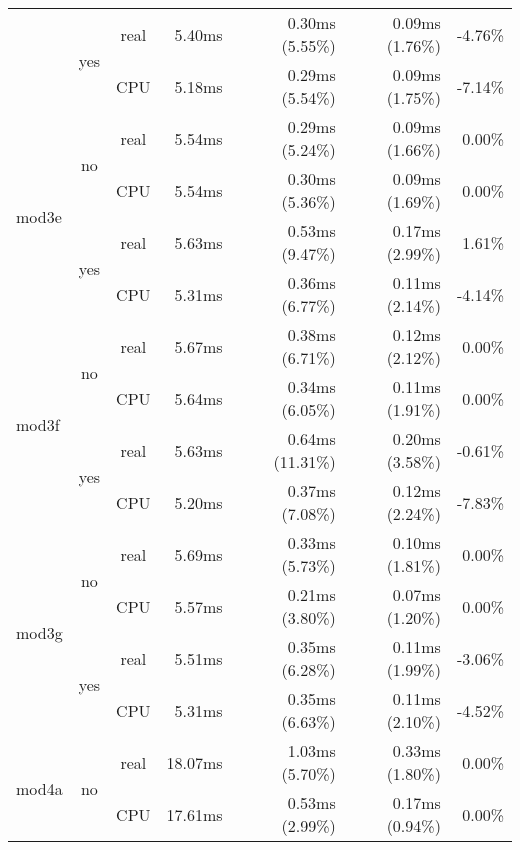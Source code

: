 \documentclass[en]{pracamgr}
\begin{document}
\begin{appendices}
\begin{small}
\begin{longtable}{|l|c|c|r|r|r|r|}
                          \cline{2-7}
                          & \multirow{2}{*}{yes} & real & 5.40ms & 0.30ms (5.55\%) & 0.09ms (1.76\%) & -4.76\% \\*
                          &                      & CPU  & 5.18ms & 0.29ms (5.54\%) & 0.09ms (1.75\%) & -7.14\% \\
\hline
\multirow{4}{*}{mod3e}    & \multirow{2}{*}{no}  & real & 5.54ms & 0.29ms (5.24\%) & 0.09ms (1.66\%) & 0.00\% \\*
                          &                      & CPU  & 5.54ms & 0.30ms (5.36\%) & 0.09ms (1.69\%) & 0.00\% \\*
                          \cline{2-7}
                          & \multirow{2}{*}{yes} & real & 5.63ms & 0.53ms (9.47\%) & 0.17ms (2.99\%) & 1.61\% \\*
                          &                      & CPU  & 5.31ms & 0.36ms (6.77\%) & 0.11ms (2.14\%) & -4.14\% \\
\hline
\multirow{4}{*}{mod3f}    & \multirow{2}{*}{no}  & real & 5.67ms & 0.38ms (6.71\%) & 0.12ms (2.12\%) & 0.00\% \\*
                          &                      & CPU  & 5.64ms & 0.34ms (6.05\%) & 0.11ms (1.91\%) & 0.00\% \\*
                          \cline{2-7}
                          & \multirow{2}{*}{yes} & real & 5.63ms & 0.64ms (11.31\%) & 0.20ms (3.58\%) & -0.61\% \\*
                          &                      & CPU  & 5.20ms & 0.37ms (7.08\%) & 0.12ms (2.24\%) & -7.83\% \\
\hline
\multirow{4}{*}{mod3g}    & \multirow{2}{*}{no}  & real & 5.69ms & 0.33ms (5.73\%) & 0.10ms (1.81\%) & 0.00\% \\*
                          &                      & CPU  & 5.57ms & 0.21ms (3.80\%) & 0.07ms (1.20\%) & 0.00\% \\*
                          \cline{2-7}
                          & \multirow{2}{*}{yes} & real & 5.51ms & 0.35ms (6.28\%) & 0.11ms (1.99\%) & -3.06\% \\*
                          &                      & CPU  & 5.31ms & 0.35ms (6.63\%) & 0.11ms (2.10\%) & -4.52\% \\
\hline
\multirow{4}{*}{mod4a}    & \multirow{2}{*}{no}  & real & 18.07ms & 1.03ms (5.70\%) & 0.33ms (1.80\%) & 0.00\% \\*
                          &                      & CPU  & 17.61ms & 0.53ms (2.99\%) & 0.17ms (0.94\%) & 0.00\% \\*

\end{longtable}
\end{small}
\end{appendices}
\end{document}
